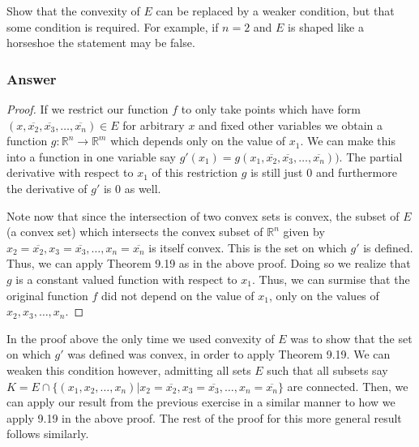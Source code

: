 \documentclass[12pt]{article}
\begin{document}
Show that the convexity of $E$ can be replaced by a weaker condition, but that some condition is required. For example, if $n=2$ and $E$ is shaped like a horseshoe the statement may be false.
\subsubsection{Answer}
\begin{proof}
If we restrict our function $f$ to only take points which have form $(x, \overline{x_2}, \overline{x_3}, \dots, \overline{x_n})\in E$ for arbitrary $x$ and fixed other variables we obtain a function $g: \mathbb{R}^n \to \mathbb{R}^m$ which depends only on the value of $x_1$. We can make this into a function in one variable say $g'(x_1) = g(x_1,\overline{x_2}, \overline{x_3}, \dots, \overline{x_n}))$. The partial derivative with respect to $x_1$ of this restriction $g$ is still just 0 and furthermore the derivative of $g'$ is 0 as well.

Note now that since the intersection of two convex sets is convex, the subset of $E$ (a convex set) which intersects the convex subset of $\mathbb{R}^n$ given by $x_2 = \overline{x_2}, x_3 = \overline{x_3}, \dots, x_n = \overline{x_n}$ is itself convex.  This is the set on which $g'$ is defined. Thus, we can apply Theorem 9.19 as in the above proof. Doing so we realize that $g$ is a constant valued function with respect to $x_1$. Thus, we can surmise that the original function $f$ did not depend on the value of $x_1$, only on the values of $x_2,x_3,\dots,x_n$.
\end{proof}

In the proof above the only time we used convexity of $E$ was to show that the set on which $g'$ was defined was convex, in order to apply Theorem 9.19. We can weaken this condition however, admitting all sets $E$ such that all subsets  say $K=E \cap \{(x_1,x_2, \dots, x_n) | x_2 = \overline{x_2}, x_3 = \overline{x_3}, \dots, x_n = \overline{x_n} \}$  are connected. Then, we can apply our result from the previous exercise in a similar manner to how we apply 9.19 in the above proof. The rest of the proof for this more general result follows similarly. 
\end{document}
